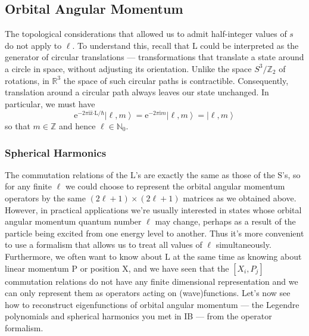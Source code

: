 \documentclass{article}
\theoremstyle{plain}\theoremheaderfont{\normalfont\itshape}\theorembodyfont{\rmfamily}\theoremseparator{.}\newtheorem*{rem}{Remark}\newtheorem*{ex}{Example}\newtheorem*{proof}{Proof}\newtheorem*{altp}{Alternative proof}
\theoremstyle{plain}\theoremheaderfont{\normalfont\bfseries}\theorembodyfont{\rmfamily}\theoremseparator{.}\newtheorem{thm}{Theorem}[section]\newtheorem{lem}[thm]{Lemma}\newtheorem{prop}[thm]{Proposition}\newtheorem*{cor}{Corollary}\newtheorem{defn}[thm]{Definition}\newtheorem{clm}[thm]{Claim}\newtheorem{clminproof}{Claim}
\theoremstyle{break}\theoremheaderfont{\normalfont\itshape}\theorembodyfont{\rmfamily}\theoremseparator{.\medskip}\newtheorem*{proofskip}{Proof}\newtheorem*{exs}{Examples}\newtheorem*{rems}{Remarks}
\theoremstyle{break}\theoremheaderfont{\normalfont\bfseries}\theorembodyfont{\rmfamily}\theoremseparator{.\medskip}\newtheorem{lemskip}[thm]{Lemma}\newtheorem{defnskip}[thm]{Definition}\newtheorem{propskip}[thm]{Proposition}\newtheorem{thmskip}[thm]{Theorem}
\numberwithin{equation}{section}
\newcommand{\ii}{\mathrm{i}}
\newcommand{\ee}{\mathrm{e}}
\newcommand{\ket}[1]{\left| #1 \right\rangle}
\newcommand{\vb}[1]{\bm{\mathrm{#1}}}
\newcommand{\vu}[1]{\hat{\bm{\mathrm{#1}}}}
\newcommand{\vdot}{\bm{\cdot}}
\newcommand{\NN}{\mathbb{N}}
\newcommand{\ZZ}{\mathbb{Z}}
\newcommand{\RR}{\mathbb{R}}
\begin{document}
    \subsection{Orbital Angular Momentum}
    The topological considerations that allowed us to admit half-integer values of \(s\) do not apply to \(\ell\). To understand this, recall that \(\vb{L}\) could be interpreted as the generator of circular translations --- transformations that translate a state around a circle in space, without adjusting its orientation. Unlike the space \(S^3/\ZZ_2\) of rotations, in \(\RR^3\) the space of such circular paths is contractible. Consequently, translation around a circular path always leaves our state unchanged. In particular, we must have
    \begin{equation}
        \ee^{-2\pi \ii\vu{z}\vdot\vb{L}/\hbar}\ket{\ell,m}=\ee^{-2\pi \ii m}\ket{\ell,m}=\ket{\ell,m}
    \end{equation}
    so that \(m\in\ZZ\) and hence \(\ell\in\NN_0\).

    \subsubsection{Spherical Harmonics}
    The commutation relations of the \(\vb{L}\)'s are exactly the same as those of the \(\vb{S}\)'s, so for any finite \(\ell\) we could choose to represent the orbital angular momentum operators by the same \((2\ell+1)\times (2\ell+1)\) matrices as we obtained above. However, in practical applications we're usually interested in states whose orbital angular momentum quantum number \(\ell\) may change, perhaps as a result of the particle being excited from one energy level to another. Thus it's more convenient to use a formalism that allows us to treat all values of \(\ell\) simultaneously. Furthermore, we often want to know about \(\vb{L}\) at the same time as knowing about linear momentum \(\vb{P}\) or position \(\vb{X}\), and we have seen that the \([X_i,P_j]\) commutation relations do not have any finite dimensional representation and we can only represent them as operators acting on (wave)functions. Let's now see how to reconstruct eigenfunctions of orbital angular momentum --- the Legendre polynomials and spherical harmonics you met in IB --- from the operator formalism.
\end{document}
